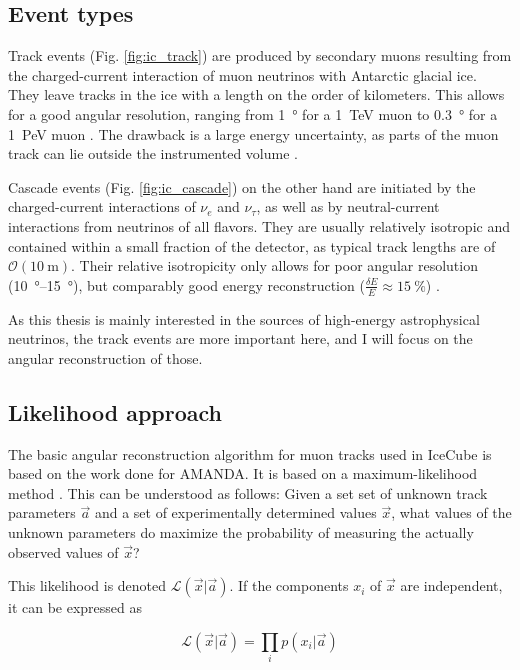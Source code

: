 \subsection{Event types}

Track events (Fig. \ref{fig:ic_track}) are produced by secondary muons resulting from the charged-current interaction of muon neutrinos with Antarctic glacial ice. They leave tracks in the ice with a length on the order of kilometers. This allows for a good angular resolution, ranging from \SI{1}{\degree} for a \SI{1}{\TeV} muon to \SI{0.3}{\degree} for a \SI{1}{\peta\eV} muon . The drawback is a large energy uncertainty, as parts of the muon track can lie outside the instrumented volume .

Cascade events (Fig. \ref{fig:ic_cascade}) on the other hand are initiated by the charged-current interactions of $\nu_e$ and $\nu_\tau$, as well as by neutral-current interactions from neutrinos of all flavors. They are usually relatively isotropic and contained within a small fraction of the detector, as typical track lengths are of $\mathcal{O}(\SI{10}{\meter})$. Their relative isotropicity only allows for poor angular resolution (\SIrange{10}{15}{\degree}), but comparably good energy reconstruction ($\frac{\delta E}{E} \approx \SI{15}{\percent}$) \cite{Aartsen2017a}.

As this thesis is mainly interested in the sources of high-energy astrophysical neutrinos, the track events are more important here, and I will focus on the angular reconstruction of those.

\subsection{Likelihood approach}
The basic angular reconstruction algorithm for muon tracks used in IceCube is based on the work done for AMANDA. It is based on a maximum-likelihood method . This can be understood as follows: Given a set set of unknown track parameters $\vec{a}$ and a set of experimentally determined values $\vec{x}$, what values of the unknown parameters do maximize the probability of measuring the actually observed values of $\vec{x}$?

This likelihood is denoted $\mathcal{L}(\vec{x}|\vec{a})$. If the components $x_i$ of $\vec{x}$ are independent, it can be expressed as

\begin{equation}
\mathcal{L}(\vec{x}|\vec{a}) = \prod_i p(x_i|\vec{a})
\end{equation}

